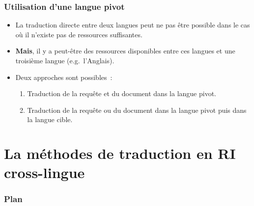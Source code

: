 \documentclass[12pt,aspectratio=43,dvipsnames,table]{beamer}
\begin{document}
\begin{frame}
    \frametitle{Utilisation d'une langue pivot}
    \begin{itemize} \itemsep10pt
        \item La traduction directe entre deux langues peut ne pas être possible
              dans le cas où il n'existe pas de ressources suffisantes.
        \item \textbf{Mais}, il y a peut-être des ressources disponibles entre 
              ces langues et une troisième langue (e.g.~l'Anglais).
        \item Deux approches sont possibles~:
        \begin{enumerate}
            \item Traduction de la requête et du document dans la langue pivot.
            \item Traduction de la requête ou du document dans la langue pivot 
                  puis dans la langue cible.
        \end{enumerate}
    \end{itemize}
\end{frame}


\section{La méthodes de traduction en RI cross-lingue}


\begin{frame}
\frametitle{Plan}
\tableofcontents[sectionstyle=show,subsectionstyle=hide,subsubsectionstyle=hide]
\end{frame}
\end{document}
